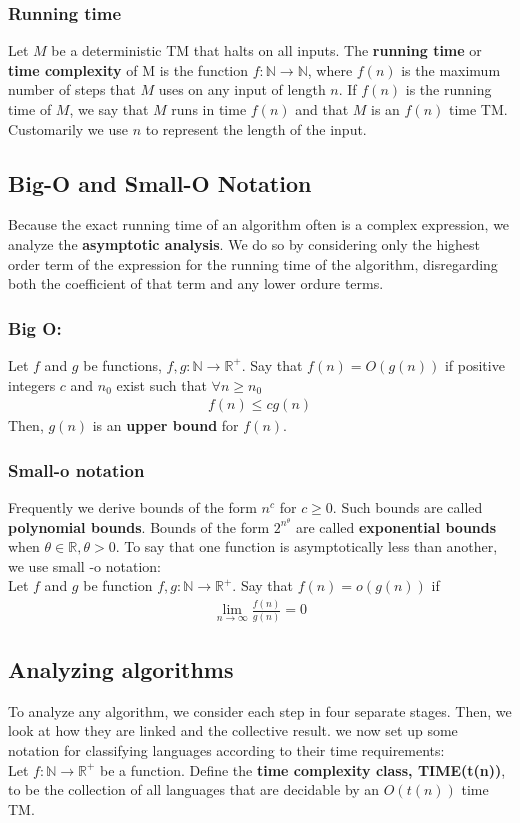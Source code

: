 \documentclass[a4paper]{article}
\begin{document}
\subsubsection{Running time}
Let $M$ be a deterministic TM that halts on all inputs. The {\bf running time} or {\bf time complexity} of M is the function $f:\mathbb{N}\rightarrow\mathbb{N}$, where $f(n)$ is the maximum number of steps that $M$ uses on any input of length $n$. If $f(n)$ is the running time of $M$, we say that $M$ runs in time $f(n)$ and that $M$ is an $f(n)$ time TM. Customarily we use $n$ to represent the length of the input. 
\subsection{Big-O and Small-O Notation} %
\label{sub:Big-o and small-O Notatio}
Because the exact running time of an algorithm often is a complex expression, we analyze the {\bf asymptotic analysis}. We do so by considering only the highest order term of the expression for the running time of the algorithm, disregarding both the coefficient of that term and any lower ordure terms.
\subsubsection{Big O:}
Let $f$ and $g$ be functions, $f,g:\mathbb{N}\rightarrow\mathbb{R}^+$. Say that $f(n)=O(g(n))$ if positive integers $c$ and $n_0$ exist such that $\forall n\geq n_0$
\begin{align}
  f(n)\leq cg(n)
\end{align}
Then, $g(n)$ is an {\bf upper bound} for $f(n)$.
\subsubsection{Small-o notation}
Frequently we derive bounds of the form $n^c$ for $c\geq0$. Such bounds are called {\bf polynomial bounds}. Bounds of the form $2^{n^\theta}$ are called {\bf exponential bounds} when $\theta\in\mathbb{R}, \theta>0$. To say that one function is asymptotically less than another, we use small -o notation:\\
Let $f$ and $g$ be function $f,g:\mathbb{N}\rightarrow\mathbb{R}^+$. Say that $f(n)=o(g(n))$ if
\begin{align}
  \lim_{n\rightarrow\infty}\frac{f(n)}{g(n)}=0
\end{align}
\subsection{Analyzing algorithms} %
\label{sub:Analyzing algorithms}
To analyze any algorithm, we consider each step in four separate stages. Then, we look at how they are linked and the collective result. we now set up some notation for classifying languages according to their time requirements: \\
Let $f:\mathbb{N}\rightarrow\mathbb{R}^+$ be a function. Define the {\bf time complexity class, TIME(t(n))}, to be the collection of all languages that are decidable by an $O(t(n))$ time TM.\\
\end{document}
